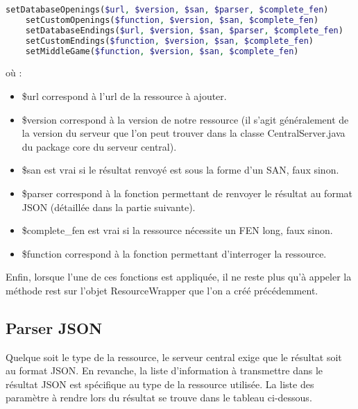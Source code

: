 \documentclass[a4paper,11pt]{article}
\begin{document}
\lstset{xleftmargin =-2.2cm}
\begin{lstlisting}[language=php]
	setDatabaseOpenings($url, $version, $san, $parser, $complete_fen)
	setCustomOpenings($function, $version, $san, $complete_fen)
	setDatabaseEndings($url, $version, $san, $parser, $complete_fen)
	setCustomEndings($function, $version, $san, $complete_fen)
	setMiddleGame($function, $version, $san, $complete_fen)
\end{lstlisting}
	
où :

\begin{itemize}
	\item \$url correspond à l'url de la ressource à ajouter.
	\item \$version correspond à la version de notre ressource (il s'agit généralement de la version du serveur que l'on peut trouver dans la classe CentralServer.java du package core du serveur central).
	\item \$san est vrai si le résultat renvoyé est sous la forme d'un SAN, faux sinon.
	\item \$parser correspond à la fonction permettant de renvoyer le résultat au format JSON (détaillée dans la partie suivante).
	\item \$complete\_fen est vrai si la ressource nécessite un FEN long, faux sinon.
	\item \$function correspond à la fonction permettant d'interroger la ressource. 
\end{itemize}
Enfin, lorsque l'une de ces fonctions est appliquée, il ne reste plus qu'à appeler la méthode rest sur l'objet ResourceWrapper que l'on a créé précédemment.
	
\subsection{Parser JSON}
Quelque soit le type de la ressource, le serveur central exige que le résultat soit au format JSON. En revanche, la liste d'information à transmettre dans le résultat JSON est spécifique au type de la ressource utilisée. La liste des paramètre à rendre lors du résultat se trouve dans le tableau ci-dessous.
\end{document}
